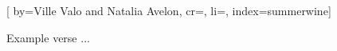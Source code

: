 
[%
    by={Ville Valo and Natalia Avelon},
    cr={},
    li={},
    index={summerwine}]


    \label{summerwine}

    \beginverse
        Example verse ...
    \endverse
\endsong
